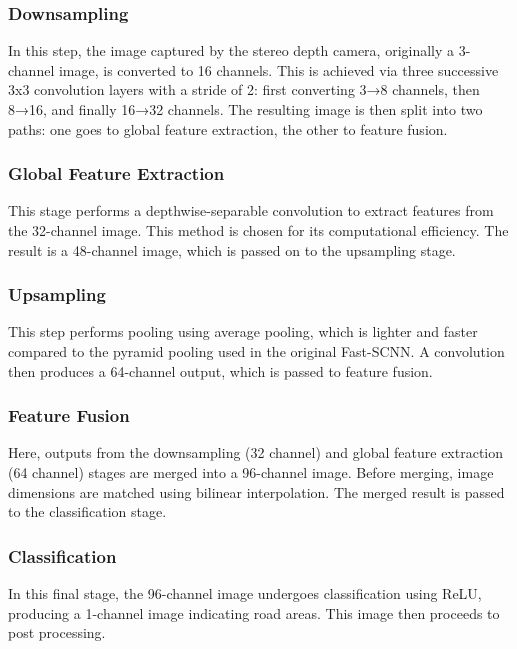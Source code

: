 \documentclass[conference]{IEEEtran}
\begin{document}
\subsubsection{Downsampling} 
In this step, the image captured by the stereo depth camera, originally a 3-channel image, is converted to 16 channels. This is achieved via three successive 3x3 convolution layers with a stride of 2: first converting 3→8 channels, then 8→16, and finally 16→32 channels. The resulting image is then split into two paths: one goes to global feature extraction, the other to feature fusion. 

\subsubsection{Global Feature Extraction}
This stage performs a depthwise-separable convolution to extract features from the 32-channel image. This method is chosen for its computational efficiency. The result is a 48-channel image, which is passed on to the upsampling stage. 

\subsubsection{Upsampling}
This step performs pooling using average pooling, which is lighter and faster compared to the pyramid pooling used in the original Fast-SCNN. A convolution then produces a 64-channel output, which is passed to feature fusion.

\subsubsection{Feature Fusion}
Here, outputs from the downsampling (32 channel) and global feature extraction (64 channel) stages are merged into a 96-channel image. Before merging, image dimensions are matched using bilinear interpolation. The merged result is passed to the classification stage.

\subsubsection{Classification}
In this final stage, the 96-channel image undergoes classification using ReLU, producing a 1-channel image indicating road areas. This image then proceeds to post processing.
\end{document}
